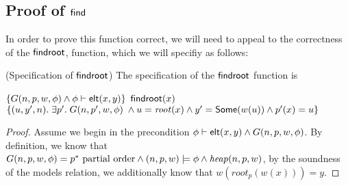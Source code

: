 \subsection{Proof of $\mathsf{find}$}

In order to prove this function correct, we will need to appeal to the
correctness of the $\mathsf{findroot}$, function, which we will specifiy as
follows:

\begin{prop}{(Specification of $\mathsf{findroot}$)}
  The specification of the $\mathsf{findroot}$ function is 

  \begin{specification}
    \nextline $\{G(n, p, w, \phi) \land {\phi} \vdash \mathsf{elt}({x}, {y})\}$
    \nextline $\mathsf{findroot}(x)$ 
    \nextline $\{(u, y', n).\; \exists p'.\;G(n, p', w, \phi) \;\land
                       u = \mathit{root}(x) \land y' = \mathsf{Some}(w(u)) 
                       \land p'(x) = u\}$
  \end{specification}
\end{prop}

\begin{proof}
Assume we begin in the precondition ${\phi} \vdash \mathsf{elt}({x}, {y}) \land
G(n, p, w, \phi)$.  By definition, we know that $G(n, p, w, \phi) =
p^{*}\mbox{ partial order} \land (n,p,w) \models \phi \land
\mathit{heap}(n,p,w)$, by the soundness of the models relation, we
additionally know that $w(\mathit{root}_p(w(x))) = y$.


\end{proof}



